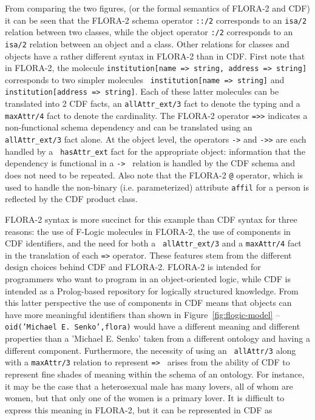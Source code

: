 %
From comparing the two figures, (or the formal semantics of FLORA-2
and CDF) it can be seen that the FLORA-2 schema operator {\tt ::/2}
corresponds to an {\tt isa/2} relation between two classes, while the
object operator {\tt :/2} corresponds to an {\tt isa/2} relation
between an object and a class.  Other relations for classes and
objects have a rather different syntax in FLORA-2 than in CDF.  First
note that in FLORA-2, the molecule {\tt institution[name => string,
    address => string]} corresponds to two simpler molecules {\tt
  institution[name => string]} and {\tt institution[address =>
    string]}.  Each of these latter molecules can be translated into 2
CDF facts, an {\tt allAttr\_ext/3} fact to denote the typing and a
{\tt maxAttr/4} fact to denote the cardinality.  The FLORA-2 operator
{\tt =>>} indicates a non-functional schema dependency and can be
translated using an {\tt allAttr\_ext/3} fact alone.  At the object
level, the operators {\tt ->} and {\tt ->>} are each handled by a {\tt
  hasAttr\_ext} fact for the appropriate object: information that the
dependency is functional in a {\tt -> } relation is handled by the CDF
schema and does not need to be repeated.  Also note that the FLORA-2
{\tt @} operator, which is used to handle the non-binary
(i.e. parameterized) attribute {\tt affil} for a person is reflected
by the CDF product class.

FLORA-2 syntax is more succinct for this example than CDF syntax for
three reasons: the use of F-Logic molecules in FLORA-2, the use of
components in CDF identifiers, and the need for both a {\tt
allAttr\_ext/3} and a {\tt maxAttr/4} fact in the translation of each
{\tt =>} operator.  These features stem from the different design
choices behind CDF and FLORA-2.  FLORA-2 is intended for programmers
who want to program in an object-oriented logic, while CDF is intended
as a Prolog-based repository for logically structured knowledge.  From
this latter perspective the use of components in CDF means that
objects can have more meaningful identifiers than shown in
Figure~\ref{fig:flogic-model} -- {\tt oid('Michael E. Senko',flora)}
would have a different meaning and different properties than a
'Michael E. Senko' taken from a different ontology and having a
different component.  Furthermore, the necessity of using an {\tt
allAttr/3} along with a {\tt maxAttr/3} relation to represent {\tt =>
} arises from the ability of CDF to represent fine shades of meaning
within the schema of an ontology.  For instance, it may be the case
that a heterosexual male has many lovers, all of whom are women, but
that only one of the women is a primary lover.  It is difficult to
express this meaning in FLORA-2, but it can be represented in CDF as

